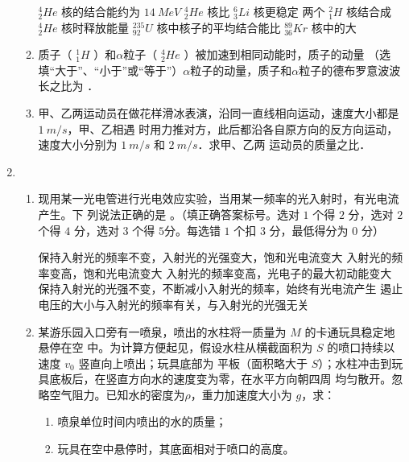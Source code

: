 \begin{enumerate}
\begin{enumerate}
\fourchoices
{$ ^{4}_{2}He $ 核的结合能约为 $ 14 \ MeV $}
{$ ^{4}_{2}He $ 核比 $ ^{6}_{3}Li $ 核更稳定}
{两个 $ ^{2}_{1}H $ 核结合成 $ ^{4}_{2}He $ 核时释放能量}
{$ ^{235}_{92}U $ 核中核子的平均结合能比 $ ^{89}_{36}K r $ 核中的大}



\item 
质子（ $ ^{1}_{1}H $ ）和$ \alpha $粒子（ $ ^{4}_{2}He $ ）被加速到相同动能时，质子的动量
 \underlinegap 
（选填“大于”、“小于”或“等于”）$ \alpha $粒子的动量，质子和$ \alpha $粒子的德布罗意波波长之比为 \underlinegap ．



\item 
甲、乙两运动员在做花样滑冰表演，沿同一直线相向运动，速度大小都是 $ 1 \ m /s $，甲、乙相遇
时用力推对方，此后都沿各自原方向的反方向运动，速度大小分别为 $ 1 \ m /s $ 和 $ 2 \ m /s $．求甲、乙两
运动员的质量之比．




\end{enumerate}


\item 
{}
\begin{enumerate}
	\item
现用某一光电管进行光电效应实验，当用某一频率的光入射时，有光电流产生。下
列说法正确的是 \underlinegap 。（填正确答案标号。选对 $ 1 $ 个得 $ 2 $ 分，选对 $ 2 $ 个得 $ 4 $ 分，选对 $ 3 $ 个得
$ 5 $分。每选错 $ 1 $ 个扣 $ 3 $ 分，最低得分为 $ 0 $ 分）


\fivechoices
{保持入射光的频率不变，入射光的光强变大，饱和光电流变大}
{入射光的频率变高，饱和光电流变大}
{入射光的频率变高，光电子的最大初动能变大}
{保持入射光的光强不变，不断减小入射光的频率，始终有光电流产生}
{遏止电压的大小与入射光的频率有关，与入射光的光强无关}



\item 
某游乐园入口旁有一喷泉，喷出的水柱将一质量为 $ M $ 的卡通玩具稳定地悬停在空
中。为计算方便起见，假设水柱从横截面积为 $ S $ 的喷口持续以速度 $ v_{0} $ 竖直向上喷出；玩具底部为
平板（面积略大于 $ S $）；水柱冲击到玩具底板后，在竖直方向水的速度变为零，在水平方向朝四周
均匀散开。忽略空气阻力。已知水的密度为$ \rho $，重力加速度大小为 $ g $，求：
\begin{enumerate}
	\item
喷泉单位时间内喷出的水的质量；
\item 
玩具在空中悬停时，其底面相对于喷口的高度。
	

\end{enumerate}
\end{enumerate}
\end{enumerate}
